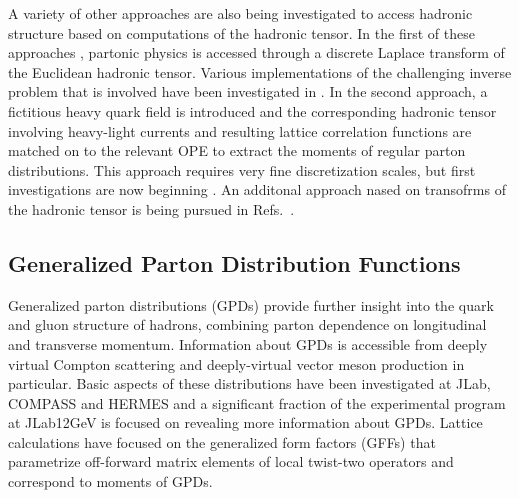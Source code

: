 A variety of other approaches are also being investigated to access hadronic structure \cite{Liu:1993cv,Aglietti:1998mz,Detmold:2005gg,Liu:2016djw} based on computations of the hadronic tensor. In the first of these approaches \cite{Liu:1993cv,Liu:2016djw}, partonic physics is accessed through a discrete Laplace transform of the Euclidean hadronic tensor. Various implementations of the challenging inverse problem that is involved have been investigated in \cite{Liang:2017mye}. In the second approach, a fictitious heavy quark field is introduced and the corresponding hadronic tensor involving heavy-light currents and resulting lattice correlation functions are matched on to the relevant OPE to extract the moments of regular parton distributions. This approach requires very fine discretization scales, but first investigations are now beginning \cite{Detmold:2018kwu}. 
An additonal approach nased on transofrms of the hadronic tensor is being pursued in Refs.~\cite{Chambers:2017dov}.

\subsection{Generalized Parton Distribution Functions}

%	

Generalized parton distributions (GPDs) \cite{Ji:2001wha,Radyushkin:1997ki,Diehl:2003ny,Belitsky:2005qn} provide further insight into the quark and gluon structure of hadrons, combining parton dependence on longitudinal and transverse momentum. Information about GPDs is accessible from deeply virtual Compton scattering and deeply-virtual vector meson production in particular. Basic aspects of these distributions have been investigated at JLab, COMPASS and HERMES and a significant fraction of the experimental program at JLab12GeV is focused on revealing more  information about  GPDs. Lattice calculations have focused on the generalized form factors (GFFs) that parametrize off-forward matrix elements of local twist-two operators and correspond to moments of GPDs. 

